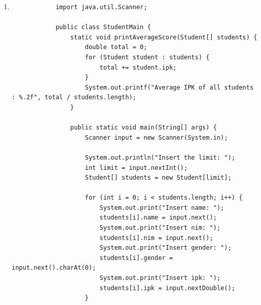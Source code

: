 \documentclass[12pt,titlepage]{article}
\begin{document}
\begin{enumerate}
{\begin{verbatim}
                    for (int i = 0; i < students.length; i++) {
                        System.out.print("Insert name: ");
                        students[i].name = input.next();
                        System.out.print("Insert nim: ");
                        students[i].nim = input.next();
                        System.out.print("Insert gender: ");
                        students[i].gender = input.next().charAt(0);
                        System.out.print("Insert ipk: ");
                        students[i].ipk = input.nextDouble();
                    }

                    for (int i = 0; i < students.length; i++) {
                        System.out.printf(
                                "Student %d\nname : %s\nnim : %s\ngender : %c\nIPK score : %.2f\n\n",
                                i + 1,
                                students[i].name,
                                students[i].nim,
                                students[i].gender,
                                students[i].ipk
                        );
                    }
                }
            }

        \end{verbatim}
    }
    \item {
        \begin{verbatim}
            import java.util.Scanner;

            public class StudentMain {
                static void printAverageScore(Student[] students) {
                    double total = 0;
                    for (Student student : students) {
                        total += student.ipk;
                    }
                    System.out.printf("Average IPK of all students : %.2f", total / students.length);
                }

                public static void main(String[] args) {
                    Scanner input = new Scanner(System.in);

                    System.out.println("Insert the limit: ");
                    int limit = input.nextInt();
                    Student[] students = new Student[limit];

                    for (int i = 0; i < students.length; i++) {
                        System.out.print("Insert name: ");
                        students[i].name = input.next();
                        System.out.print("Insert nim: ");
                        students[i].nim = input.next();
                        System.out.print("Insert gender: ");
                        students[i].gender = input.next().charAt(0);
                        System.out.print("Insert ipk: ");
                        students[i].ipk = input.nextDouble();
                    }


\end{verbatim}}
\end{enumerate}
\end{document}
